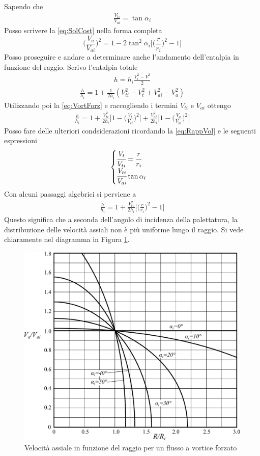 Sapendo che 
\begin{align*}
\frac{V_{ti}}{V_{ai}} = \tan \alpha_i
\end{align*}
Posso scrivere la \ref{eq:SolCost} nella forma completa
\begin{equation}
\boxed{ \bigg( \frac{V_a}{V_{ai}} \bigg)^2 = 1- 2 \tan^2 \alpha_i \bigg[ \bigg( \frac{r}{r_i} \bigg)^2 -1 \bigg] }
\label{eq:RappVol}
\end{equation}
Posso proseguire e andare a determinare anche l'andamento dell'entalpia in funzione del raggio.
Scrivo l'entalpia totale
\begin{align*}
h = h_i \frac{V_i^2 - V^2}{2}
\end{align*}
\begin{align*}
\frac{h}{h_i} = 1+ \frac{1}{2 h_i} (V_{ti}^2 - V_t^2 + V_{ai}^2 -V_a^2)
\end{align*}
Utilizzando poi la \ref{eq:VortForz} e raccogliendo i termini $V_{ti}$ e $V_{ai}$ ottengo
\begin{align*}
\boxed{ \frac{h}{h_i} = 1+ \frac{V_{ti}^2}{2 h_i} \bigg[ 1- \bigg( \frac{V_t}{V_{ti}} \bigg)^2 \bigg] + \frac{V_{ai}^2}{2 h_i} \bigg[ 1- \bigg( \frac{V_a}{V_{ai}} \bigg)^2 \bigg] }
\end{align*}
Posso fare delle ulteriori condsiderazioni ricordando la \ref{eq:RappVol} e le seguenti espressioni
\begin{align*}
\begin{cases}
\cfrac{V_t}{V_{ti}} = \cfrac{r}{r_i}\\
\cfrac{V_{ti}}{V_{ai}} \tan \alpha_i
\end{cases}
\end{align*}
Con alcuni passaggi algebrici si perviene a
\begin{align*}
\boxed{ \frac{h}{h_i} = 1+ \frac{V_{ti}^2}{2h_i} \bigg[ \bigg( \frac{r}{r_i} \bigg)^2 -1 \bigg] }
\end{align*}
Questo significa che a seconda dell'angolo di incidenza della palettatura, la distribuzione delle velocità assiali non è più uniforme lungo il raggio. Si vede chiaramente nel diagramma in Figura \ref{fig:TurboFan}.
\begin{figure}
\centering
  \includegraphics[width=.8\textwidth]{fig/VortForz.pdf}
\caption{Velocità assiale in funzione del raggio per un flusso a vortice forzato}
\label{fig:TurboFan}
\end{figure}
